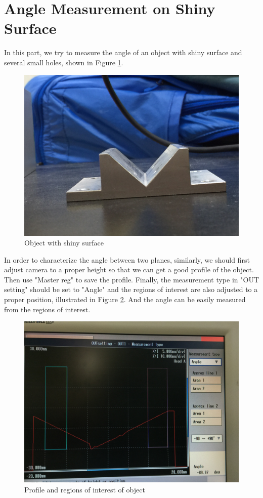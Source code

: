 \documentclass[english]{article}
\begin{document}
\section*{Angle Measurement on Shiny Surface}
In this part, we try to measure the angle of an object with shiny surface and several small holes, shown in Figure \ref {fig:three}. \\ 

\begin{figure}[H]
	\centering
	\includegraphics[width=0.8\linewidth]{Lab6/Angle5.JPG}
	\caption{Object with shiny surface}
	\label{fig:three}
\end{figure}

In order to characterize the angle between two planes, similarly, we should first adjust camera to a proper height so that we can get a good profile of the object. Then use "Master reg" to save the profile. Finally, the measurement type in "OUT setting" should be set to "Angle" and the regions of interest are also adjusted to a proper position, illustrated in Figure \ref{fig:four}. And the angle can be easily measured from the regions of interest.\\

\begin{figure}[H]
	\centering
	\includegraphics[width=0.8\linewidth]{Lab6/Angle1.JPG}
	\caption{Profile and regions of interest of object}
	\label{fig:four}
\end{figure}
\end{document}
